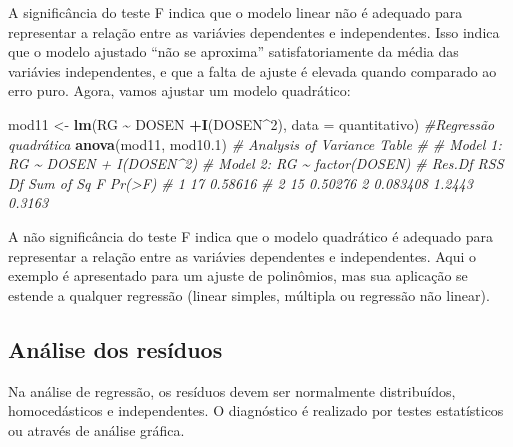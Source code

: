 \documentclass[
]{book}
\newenvironment{Shaded}{\begin{snugshade}}{\end{snugshade}}
\newcommand{\CommentTok}[1]{\textcolor[rgb]{0.56,0.35,0.01}{\textit{#1}}}
\newcommand{\DataTypeTok}[1]{\textcolor[rgb]{0.13,0.29,0.53}{#1}}
\newcommand{\DecValTok}[1]{\textcolor[rgb]{0.00,0.00,0.81}{#1}}
\newcommand{\FloatTok}[1]{\textcolor[rgb]{0.00,0.00,0.81}{#1}}
\newcommand{\KeywordTok}[1]{\textcolor[rgb]{0.13,0.29,0.53}{\textbf{#1}}}
\newcommand{\NormalTok}[1]{#1}
\newcommand{\OperatorTok}[1]{\textcolor[rgb]{0.81,0.36,0.00}{\textbf{#1}}}
\newcommand{\StringTok}[1]{\textcolor[rgb]{0.31,0.60,0.02}{#1}}
\numberwithin{equation}{section}
\newcommand{\indt}[1]{\index{#1|ST}}
\begin{document}
A significância do teste F indica que o modelo linear não é adequado para representar a relação entre as variávies dependentes e independentes. Isso indica que o modelo ajustado ``não se aproxima'' satisfatoriamente da média das variávies independentes, e que a falta de ajuste \indt{falta de ajuste} é elevada quando comparado ao erro puro. Agora, vamos ajustar um modelo quadrático:

\begin{Shaded}
\begin{Highlighting}[]
\NormalTok{mod11 \textless{}{-}}\StringTok{ }\KeywordTok{lm}\NormalTok{(RG }\OperatorTok{\textasciitilde{}}\StringTok{  }\NormalTok{DOSEN }\OperatorTok{+}\KeywordTok{I}\NormalTok{(DOSEN}\OperatorTok{\^{}}\DecValTok{2}\NormalTok{), }\DataTypeTok{data =}\NormalTok{ quantitativo) }\CommentTok{\#Regressão quadrática}
\KeywordTok{anova}\NormalTok{(mod11, mod10}\FloatTok{.1}\NormalTok{)}
\CommentTok{\# Analysis of Variance Table}
\CommentTok{\# }
\CommentTok{\# Model 1: RG \textasciitilde{} DOSEN + I(DOSEN\^{}2)}
\CommentTok{\# Model 2: RG \textasciitilde{} factor(DOSEN)}
\CommentTok{\#   Res.Df     RSS Df Sum of Sq      F Pr(\textgreater{}F)}
\CommentTok{\# 1     17 0.58616                           }
\CommentTok{\# 2     15 0.50276  2  0.083408 1.2443 0.3163}
\end{Highlighting}
\end{Shaded}

A não significância do teste F indica que o modelo quadrático é adequado para representar a relação entre as variávies dependentes e independentes. Aqui o exemplo é apresentado para um ajuste de polinômios, mas sua aplicação se estende a qualquer regressão (linear simples, múltipla ou regressão não linear).

\hypertarget{anuxe1lise-dos-resuxedduos}{%
\subsection{Análise dos resíduos}\label{anuxe1lise-dos-resuxedduos}}

Na análise de regressão, os resíduos \indt{resíduos} devem ser normalmente distribuídos, homocedásticos e independentes. O diagnóstico é realizado por testes estatísticos ou através de análise gráfica.
\end{document}
